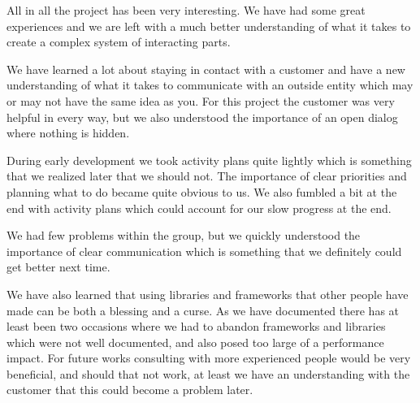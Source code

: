 All in all the project has been very interesting. We have had some great experiences and we are left with a much better understanding of what it takes to create a complex system of interacting parts.

We have learned a lot about staying in contact with a customer and have a new understanding of what it takes to communicate with an outside entity which may or may not have the same idea as you. For this project the customer was very helpful in every way, but we also understood the importance of an open dialog where nothing is hidden.

During early development we took activity plans quite lightly which is something that we realized later that we should not. The importance of clear priorities and planning what to do became quite obvious to us. We also fumbled a bit at the end with activity plans which could account for our slow progress at the end.

We had few problems within the group, but we quickly understood the importance of clear communication which is something that we definitely could get better next time.

We have also learned that using libraries and frameworks that other people have made can be both a blessing and a curse. As we have documented there has at least been two occasions where we had to abandon frameworks and libraries which were not well documented, and also posed too large of a performance impact. For future works consulting with more experienced people would be very beneficial, and should that not work, at least we have an understanding with the customer that this could become a problem later.
